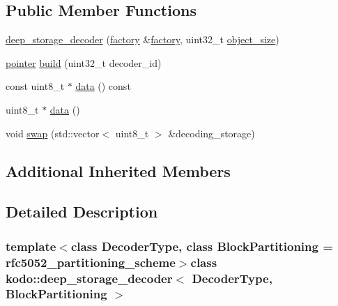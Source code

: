 \subsection*{Public Member Functions}
\begin{DoxyCompactItemize}
\item 
\hyperlink{classkodo_1_1deep__storage__decoder_a9cb1e30850c1029107197cdf3ba67d1d}{deep\-\_\-storage\-\_\-decoder} (\hyperlink{classkodo_1_1deep__storage__decoder_a5bf69d7131ad5759227a702b4b994bbd}{factory} \&\hyperlink{classkodo_1_1deep__storage__decoder_a5bf69d7131ad5759227a702b4b994bbd}{factory}, uint32\-\_\-t \hyperlink{classkodo_1_1object__decoder_ae4759b34a39ae09018af600dbc6095e7}{object\-\_\-size})
\item 
\hyperlink{classkodo_1_1deep__storage__decoder_ab50b601ef8dd7c694f6da6ced53cd3ab}{pointer} \hyperlink{classkodo_1_1deep__storage__decoder_a06a1dc07453c00eabb23bd75ed152ce6}{build} (uint32\-\_\-t decoder\-\_\-id)
\begin{DoxyCompactList}\small\item\em \end{DoxyCompactList}\item 
const uint8\-\_\-t $\ast$ \hyperlink{classkodo_1_1deep__storage__decoder_af01c53a3d5ee1095d01d293b3a639c2c}{data} () const 
\item 
uint8\-\_\-t $\ast$ \hyperlink{classkodo_1_1deep__storage__decoder_ad85587d0a96fe09bf75dbc19c67982d6}{data} ()
\begin{DoxyCompactList}\small\item\em \end{DoxyCompactList}\item 
void \hyperlink{classkodo_1_1deep__storage__decoder_af9db2b20c63a25818846d43a6248c363}{swap} (std\-::vector$<$ uint8\-\_\-t $>$ \&decoding\-\_\-storage)
\end{DoxyCompactItemize}
\subsection*{Additional Inherited Members}


\subsection{Detailed Description}
\subsubsection*{template$<$class Decoder\-Type, class Block\-Partitioning = rfc5052\-\_\-partitioning\-\_\-scheme$>$class kodo\-::deep\-\_\-storage\-\_\-decoder$<$ Decoder\-Type, Block\-Partitioning $>$}

